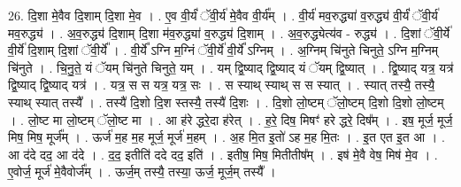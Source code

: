 \documentclass[17pt]{extarticle}
\begin{document}
26. दि॒शा मे॒वैव दि॒शाम् दि॒शा मे॒व । . ए॒व वी॒र्यं॑ ॅवी॒र्य॑ मे॒वैव वी॒र्य᳚म् । . वी॒र्य॑ मव॒रुद्ध्या॑ व॒रुद्ध्य॑ वी॒र्यं॑ ॅवी॒र्य॑ मव॒रुद्ध्य॑ । . अ॒व॒रुद्ध्य॑ दि॒शाम् दि॒शा म॑व॒रुद्ध्या॑ व॒रुद्ध्य॑ दि॒शाम् । . अ॒व॒रुद्ध्येत्य॑व - रुद्ध्य॑ । . दि॒शां ॅवी॒र्ये॑ वी॒र्ये॑ दि॒शाम् दि॒शां ॅवी॒र्ये᳚ । . वी॒र्ये᳚ ऽग्नि म॒ग्निं ॅवी॒र्ये॑ वी॒र्ये᳚ ऽग्निम् । . अ॒ग्निम् चि॑नुते चिनुते॒ ऽग्नि म॒ग्निम् चि॑नुते । . चि॒नु॒ते॒ यं ॅयम् चि॑नुते चिनुते॒ यम् । . यम् द्वि॒ष्याद् द्वि॒ष्याद् यं ॅयम् द्वि॒ष्यात् । . द्वि॒ष्याद् यत्र॒ यत्र॑ द्वि॒ष्याद् द्वि॒ष्याद् यत्र॑ । . यत्र॒ स स यत्र॒ यत्र॒ सः । . स स्याथ् स्याथ् स स स्यात् । . स्यात् तस्यै॒ तस्यै॒ स्याथ् स्यात् तस्यै᳚ । . तस्यै॑ दि॒शो दि॒श स्तस्यै॒ तस्यै॑ दि॒शः । . दि॒शो लो॒ष्टम् ॅलो॒ष्टम् दि॒शो दि॒शो लो॒ष्टम् । . लो॒ष्ट मा लो॒ष्टम् ॅलो॒ष्ट मा । . आ ह॑रे द्धरे॒दा ह॑रेत् । . ह॒रे॒ दिष॒ मिषꣳ॑ हरे द्धरे॒ दिष᳚म् । . इष॒ मूर्ज॒ मूर्ज॒ मिष॒ मिष॒ मूर्ज᳚म् । . ऊर्ज॑ म॒ह म॒ह मूर्ज॒ मूर्ज॑ म॒हम् । . अ॒ह मि॒त इ॒तो॑ ऽह म॒ह मि॒तः । . इ॒त एत इ॒त आ । . आ द॑दे दद॒ आ द॑दे । . द॒द॒ इतीति॑ ददे दद॒ इति॑ । . इतीष॒ मिष॒ मितीतीष᳚म् । . इष॑ मे॒वै वेष॒ मिष॑ मे॒व । . ए॒वोर्ज॒ मूर्ज॑ मे॒वैवोर्ज᳚म् । . ऊर्ज॒म् तस्यै॒ तस्या॒ ऊर्ज॒ मूर्ज॒म् तस्यै᳚ । \newline
\end{document}
